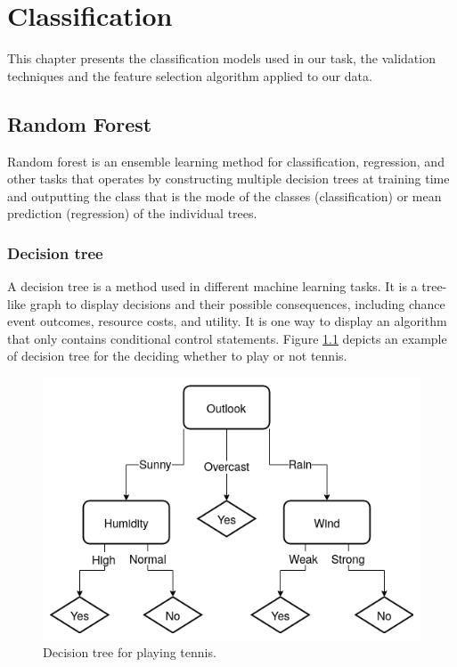 \chapter{Classification}
\label{ch:classif}
This chapter presents the classification models used in our task, the validation techniques and the feature selection algorithm applied to our data.
\section{Random Forest}
Random forest \cite{ho1995random} is an ensemble learning method for classification, regression, and other tasks that operates by constructing multiple decision trees at training time and outputting the class that is the mode of the classes (classification) or mean prediction (regression) of the individual trees. 
\subsection{Decision tree}
A decision tree \cite{kaminski2018framework} is a method used in different machine learning tasks. It is a tree-like graph to display decisions and their possible consequences, including chance event outcomes, resource costs, and utility. It is one way to display an algorithm that only contains conditional control statements. Figure \ref{fig:dec-tree} depicts an example of decision tree for the deciding whether to play or not tennis.

\begin{figure}[!h]
	\centering
	\includegraphics[width=1.0\columnwidth]{decision-tree.png}
	\caption{Decision tree for playing tennis.}
	\label{fig:dec-tree}
\end{figure}


